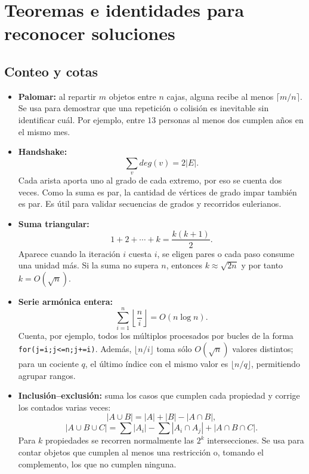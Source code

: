 \section{Teoremas e identidades para reconocer soluciones}

\subsection{Conteo y cotas}
\begin{itemize}
  \item \textbf{Palomar:} al repartir $m$ objetos entre $n$ cajas, alguna recibe
  al menos $\lceil m/n\rceil$. Se usa para demostrar que una repetici\'on o
  colisi\'on es inevitable sin identificar cu\'al. Por ejemplo, entre $13$
  personas al menos dos cumplen a\~nos en el mismo mes.
  \item \textbf{Handshake:}
  \[
      \sum_v deg(v)=2|E|.
  \]
  Cada arista aporta uno al grado de cada extremo, por eso se cuenta dos veces.
  Como la suma es par, la cantidad de v\'ertices de grado impar tambi\'en es par.
  Es \'util para validar secuencias de grados y recorridos eulerianos.
  \item \textbf{Suma triangular:}
  \[
      1+2+\cdots+k=\frac{k(k+1)}2.
  \]
  Aparece cuando la iteraci\'on $i$ cuesta $i$, se eligen pares o cada paso
  consume una unidad m\'as. Si la suma no supera $n$, entonces
  $k\approx\sqrt{2n}$ y por tanto $k=O(\sqrt n)$.
  \item \textbf{Serie arm\'onica entera:}
  \[
      \sum_{i=1}^n\left\lfloor\frac ni\right\rfloor=O(n\log n).
  \]
  Cuenta, por ejemplo, todos los m\'ultiplos procesados por bucles de la forma
  \texttt{for(j=i;j<=n;j+=i)}. Adem\'as, $\lfloor n/i\rfloor$ toma s\'olo
  $O(\sqrt n)$ valores distintos; para un cociente $q$, el \'ultimo \'indice con
  el mismo valor es $\lfloor n/q\rfloor$, permitiendo agrupar rangos.
  \item \textbf{Inclusi\'on--exclusi\'on:} suma los casos que cumplen cada
  propiedad y corrige los contados varias veces:
  \[
      |A\cup B|=|A|+|B|-|A\cap B|,
  \]
  \[
      |A\cup B\cup C|=\sum|A_i|-\sum|A_i\cap A_j|+|A\cap B\cap C|.
  \]
  Para $k$ propiedades se recorren normalmente las $2^k$ intersecciones. Se usa
  para contar objetos que cumplen al menos una restricci\'on o, tomando el
  complemento, los que no cumplen ninguna.
\end{itemize}

